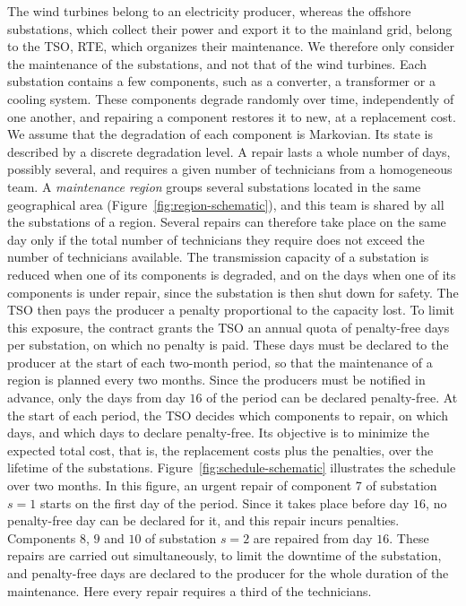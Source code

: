 \documentclass{article}
\begin{document}
The wind turbines belong to an electricity producer, whereas the offshore substations, which collect their power and
export it to the mainland grid, belong to the TSO, RTE, which organizes their maintenance. We therefore only consider
the maintenance of the substations, and not that of the wind turbines. Each substation contains a
few components, such as a converter, a transformer or a cooling system. These components degrade randomly over time,
independently of one another, and repairing a component restores it to new, at a replacement cost. We assume that the degradation of each component is Markovian. Its state is described by a discrete
degradation level. A repair lasts a whole number of days, possibly several, and requires a given number of technicians
from a homogeneous team. A \emph{maintenance region} groups several substations located in the same geographical area
(Figure~\ref{fig:region-schematic}), and this team is shared by all the substations of a region. Several repairs
can therefore take place on the same day only if the total number of technicians they require does not exceed the
number of technicians available. The transmission capacity of a substation is reduced when one of its components is degraded, and on the days when one
of its components is under repair, since the substation is then shut down for safety. The TSO then pays the producer
a penalty proportional to the capacity lost. To limit this exposure, the contract grants the TSO an annual quota of
penalty-free days per substation, on which no penalty is paid. These days must be declared to the producer
at the start of each two-month period, so that the maintenance of a region is planned every two months. Since the
producers must be notified in advance, only the days from day $16$ of the period can be declared penalty-free. At the
start of each period, the TSO decides which components to repair, on which days, and which days to declare
penalty-free. Its objective is to minimize the expected total cost, that is, the replacement costs plus the
penalties, over the lifetime of the substations. Figure~\ref{fig:schedule-schematic} illustrates the schedule over two months. In this figure, an urgent repair of
component $7$ of substation $s=1$ starts on the first day of the period. Since it takes place before day $16$, no
penalty-free day can be declared for it, and this repair incurs penalties. Components $8$, $9$ and $10$ of substation
$s=2$ are repaired from day $16$. These repairs are carried out simultaneously, to limit the downtime of the
substation, and penalty-free days are declared to the producer for the whole duration of the maintenance. Here every
repair requires a third of the technicians.
\end{document}
